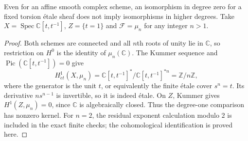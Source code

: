 \begin{proposition}\label{B:H0-counterexample}
Even for an affine smooth complex scheme, an isomorphism in degree zero for a fixed torsion \'etale sheaf does not imply isomorphisms in higher degrees. Take $X=\operatorname{Spec}\mathbb C[t,t^{-1}]$, $Z=\{t=1\}$ and $\mathcal F=\mu_n$ for any integer $n>1$.
\end{proposition}
\begin{proof}
Both schemes are connected and all $n$th roots of unity lie in $\mathbb C$, so restriction on $H^0$ is the identity of $\mu_n(\mathbb C)$. The Kummer sequence and $\operatorname{Pic}(\mathbb C[t,t^{-1}])=0$ give
\[
 H^1_{\acute et}(X,\mu_n)
 =\mathbb C[t,t^{-1}]^*/\mathbb C[t,t^{-1}]^{*n}
 =\mathbb Z/n\mathbb Z,
\]
where the generator is the unit $t$, or equivalently the finite \'etale cover $s^n=t$. Its derivative $ns^{n-1}$ is invertible, so it is indeed \'etale. On $Z$, Kummer gives $H^1(Z,\mu_n)=0$, since $\mathbb C$ is algebraically closed. Thus the degree-one comparison has nonzero kernel. For $n=2$, the residual exponent calculation modulo $2$ is included in the exact finite checks; the cohomological identification is proved here.
\end{proof}

